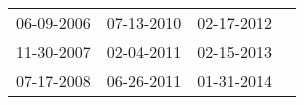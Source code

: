 \begin{supertabular}{llll}
 06-09-2006 &  07-13-2010 &  02-17-2012 \\
 11-30-2007 &  02-04-2011 &  02-15-2013 \\
 07-17-2008 &  06-26-2011 &  01-31-2014 \\
\end{supertabular}
